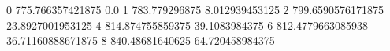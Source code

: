 0 775.766357421875 0.0
1 783.779296875 8.012939453125
2 799.6590576171875 23.8927001953125
4 814.874755859375 39.1083984375
6 812.4779663085938 36.71160888671875
8 840.48681640625 64.720458984375
